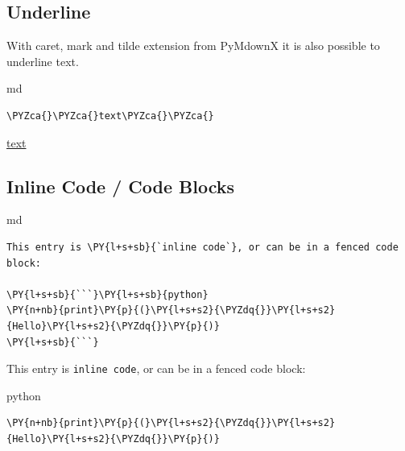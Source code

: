 \documentclass[a4paper,twoside]{article}
\begin{document}
\subsection{Underline}\label{underline}

With caret, mark and tilde extension from PyMdownX it is also possible to underline text.

\begin{code}{md}{}{}
\begin{Verbatim}[commandchars=\\\{\},breaklines, breakanywhere, commandchars=\\\{\}]
\PYZca{}\PYZca{}text\PYZca{}\PYZca{}
\end{Verbatim}
\end{code}
\begin{displayquote}

\uline{text}

\end{displayquote}
\subsection{Inline Code / Code Blocks}\label{inline-code-code-blocks}

\begin{code}{md}{}{}
\begin{Verbatim}[commandchars=\\\{\},breaklines, breakanywhere, commandchars=\\\{\}]
This entry is \PY{l+s+sb}{`inline code`}, or can be in a fenced code block:

\PY{l+s+sb}{```}\PY{l+s+sb}{python}
\PY{n+nb}{print}\PY{p}{(}\PY{l+s+s2}{\PYZdq{}}\PY{l+s+s2}{Hello}\PY{l+s+s2}{\PYZdq{}}\PY{p}{)}
\PY{l+s+sb}{```}
\end{Verbatim}
\end{code}
\begin{displayquote}

This entry is \texttt{inline code}, or can be in a fenced code block:

\begin{code}{python}{}{}
\begin{Verbatim}[commandchars=\\\{\},breaklines, breakanywhere, commandchars=\\\{\}]
\PY{n+nb}{print}\PY{p}{(}\PY{l+s+s2}{\PYZdq{}}\PY{l+s+s2}{Hello}\PY{l+s+s2}{\PYZdq{}}\PY{p}{)}
\end{Verbatim}
\end{code}

\end{displayquote}
\end{document}
